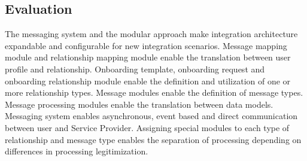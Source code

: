 \subsection{Evaluation}

The messaging system and the modular approach make integration architecture expandable and configurable for new integration scenarios.
Message mapping module and relationship mapping module enable the translation between user profile and relationship.
Onboarding template, onboarding request and onboarding relationship module enable the definition and utilization of one or more relationship types.
Message modules enable the definition of message types.
Message processing modules enable the translation between data models.
Messaging system enables asynchronous, event based and direct communication between user and Service Provider.
Assigning special modules to each type of relationship and message type enables the separation of processing depending on differences in processing legitimization.
